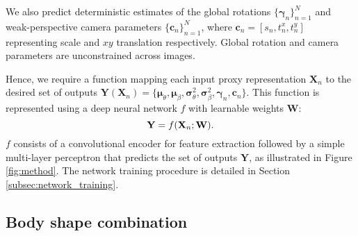 \documentclass[final]{cvpr}
\begin{document}
We also predict deterministic estimates of the global rotations $\{\boldsymbol{\gamma}_n\}_{n=1}^N$ and weak-perspective camera parameters $\{\mathbf{c}_n\}_{n=1}^N$, where $\mathbf{c}_n = [s_n, t^x_n, t^y_n]$ representing scale and $xy$ translation respectively. Global rotation and camera parameters are unconstrained across images.

Hence, we require a function mapping each input proxy representation $\mathbf{X}_n$ to the desired set of outputs $\mathbf{Y}(\mathbf{X}_n) = \{\boldsymbol{\mu}_\theta, \boldsymbol{\mu}_\beta, \boldsymbol{\sigma}^2_\theta, \boldsymbol{\sigma}^2_\beta, \boldsymbol{\gamma}_n, \mathbf{c}_n\}$. This function is represented using a deep neural network $f$ with learnable weights $\mathbf{W}$:
\begin{equation}
\mathbf{Y} = f(\textbf{X}_n; \mathbf{W}).
\label{eqn:neural_network}
\vspace{-0.1cm}
\end{equation}
$f$ consists of a convolutional encoder for feature extraction followed by a simple multi-layer perceptron that predicts the set of outputs $\mathbf{Y}$, as illustrated in Figure \ref{fig:method}. The network training procedure is detailed in Section \ref{subsec:network_training}.

\subsection{Body shape combination}
\label{subsec:body_shape_combination}
\end{document}

